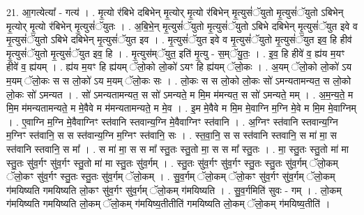 \documentclass[17pt]{extarticle}
\begin{document}
21. आ॒गत्येत्या᳚ - गत्य॑ । . मृ॒त्यो र॑बिभे दबिभेन् मृ॒त्योर् मृ॒त्यो र॑बिभेन् मृ॒त्युसं॑ॅयुतो मृ॒त्युसं॑ॅयुतो ऽबिभेन् मृ॒त्योर् मृ॒त्यो र॑बिभेन् मृ॒त्युसं॑ॅयुतः । . अ॒बि॒भे॒न् मृ॒त्युसं॑ॅयुतो मृ॒त्युसं॑ॅयुतो ऽबिभे दबिभेन् मृ॒त्युसं॑ॅयुत इवे व मृ॒त्युसं॑ॅयुतो ऽबिभे दबिभेन् मृ॒त्युसं॑ॅयुत इव । . मृ॒त्युसं॑ॅयुत इवे व मृ॒त्युसं॑ॅयुतो मृ॒त्युसं॑ॅयुत इव॒ हि हीव॑ मृ॒त्युसं॑ॅयुतो मृ॒त्युसं॑ॅयुत इव॒ हि । . मृ॒त्युस॑म्ॅयुत॒ इति॑ मृ॒त्यु - स॒म्ॅयु॒तः॒ । . इ॒व॒ हि हीवे॑ व॒ ह्य॑य म॒यꣳ हीवे॑ व॒ ह्य॑यम् । . ह्य॑य म॒यꣳ हि ह्य॑यम् ॅलो॒को लो॒को॑ ऽयꣳ हि ह्य॑यम् ॅलो॒कः । . अ॒यम् ॅलो॒को लो॒को॑ ऽय म॒यम् ॅलो॒कः स स लो॒को॑ ऽय म॒यम् ॅलो॒कः सः । . लो॒कः स स लो॒को लो॒कः सो॑ ऽमन्यतामन्यत॒ स लो॒को लो॒कः सो॑ ऽमन्यत । . सो॑ ऽमन्यतामन्यत॒ स सो॑ ऽमन्यते॒ म मि॒म म॑मन्यत॒ स सो॑ ऽमन्यते॒ मम् । . अ॒म॒न्य॒ते॒ म मि॒म म॑मन्यतामन्यते॒ म मे॒वैवे म म॑मन्यतामन्यते॒ म मे॒व । . इ॒म मे॒वैवे म मि॒म मे॒वाग्नि म॒ग्नि मे॒वे म मि॒म मे॒वाग्निम् । . ए॒वाग्नि म॒ग्नि मे॒वैवाग्निꣳ स्त॑वानि स्तवान्य॒ग्नि मे॒वैवाग्निꣳ स्त॑वानि । . अ॒ग्निꣳ स्त॑वानि स्तवान्य॒ग्नि म॒ग्निꣳ स्त॑वानि॒ स स स्त॑वान्य॒ग्नि म॒ग्निꣳ स्त॑वानि॒ सः । . स्त॒वा॒नि॒ स स स्त॑वानि स्तवानि॒ स मा॑ मा॒ स स्त॑वानि स्तवानि॒ स मा᳚ । . स मा॑ मा॒ स स मा᳚ स्तु॒तः स्तु॒तो मा॒ स स मा᳚ स्तु॒तः । . मा॒ स्तु॒तः स्तु॒तो मा॑ मा स्तु॒तः सु॑व॒र्गꣳ सु॑व॒र्गꣳ स्तु॒तो मा॑ मा स्तु॒तः सु॑व॒र्गम् । . स्तु॒तः सु॑व॒र्गꣳ सु॑व॒र्गꣳ स्तु॒तः स्तु॒तः सु॑व॒र्गम् ॅलो॒कम् ॅलो॒कꣳ सु॑व॒र्गꣳ स्तु॒तः स्तु॒तः सु॑व॒र्गम् ॅलो॒कम् । . सु॒व॒र्गम् ॅलो॒कम् ॅलो॒कꣳ सु॑व॒र्गꣳ सु॑व॒र्गम् ॅलो॒कम् ग॑मयिष्यति गमयिष्यति लो॒कꣳ सु॑व॒र्गꣳ सु॑व॒र्गम् ॅलो॒कम् ग॑मयिष्यति । . सु॒व॒र्गमिति॑ सुवः - गम् । . लो॒कम् ग॑मयिष्यति गमयिष्यति लो॒कम् ॅलो॒कम् ग॑मयिष्य॒तीतीति॑ गमयिष्यति लो॒कम् ॅलो॒कम् ग॑मयिष्य॒तीति॑ । \newline
\end{document}
